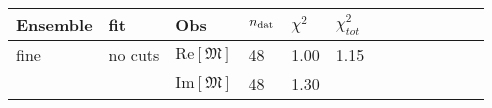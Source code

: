 \begin{tabularx}{\textwidth}{XXXXXXXcccccc}
\toprule
 Ensemble & fit         & Obs            & $n_{\rm dat}$ & $\chi^2$  & $\chi^2_{tot}$  \\
\midrule
fine    & no cuts       & $\text{Re}\left[\mathfrak{M}\right]$      &  48           & 1.00      & 1.15  \\
        &               & $\text{Im}\left[\mathfrak{M}\right]$      &  48           & 1.30      &       \\
 

\bottomrule
\end{tabularx}
